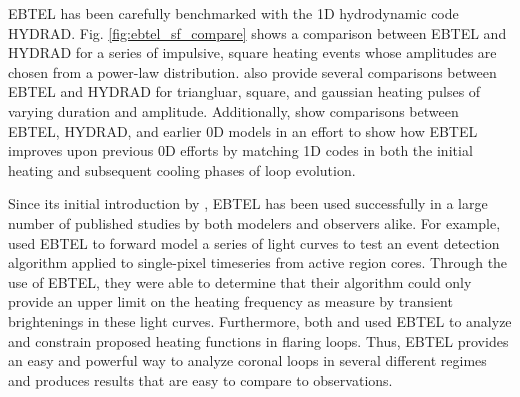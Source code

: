 %
\par EBTEL has been carefully benchmarked with the 1D hydrodynamic code HYDRAD. Fig. \ref{fig:ebtel_sf_compare} shows a comparison between EBTEL and HYDRAD for a series of impulsive, square heating events whose amplitudes are chosen from a power-law distribution. \citet{cargill_enthalpy-based_2012} also provide several comparisons between EBTEL and HYDRAD for triangluar, square, and gaussian heating pulses of varying duration and amplitude. Additionally, \citet{cargill_enthalpy-based_2012-1} show comparisons between EBTEL, HYDRAD, and earlier 0D models in an effort to show how EBTEL improves upon previous 0D efforts by matching 1D codes in both the initial heating and subsequent cooling phases of loop evolution.
%
\par Since its initial introduction by \citet{klimchuk_highly_2008}, EBTEL has been used successfully in a large number of published studies by both modelers and observers alike. For example, \citet{ugarte-urra_determining_2014} used EBTEL to forward model a series of light curves to test an event detection algorithm applied to single-pixel timeseries from active region cores. Through the use of EBTEL, they were able to determine that their algorithm could only provide an upper limit on the heating frequency as measure by transient brightenings in these light curves. Furthermore, both \citet{qiu_heating_2012} and \citet{liu_determining_2013} used EBTEL to analyze and constrain proposed heating functions in flaring loops. Thus, EBTEL provides an easy and powerful way to analyze coronal loops in several different regimes and produces results that are easy to compare to observations.
%
